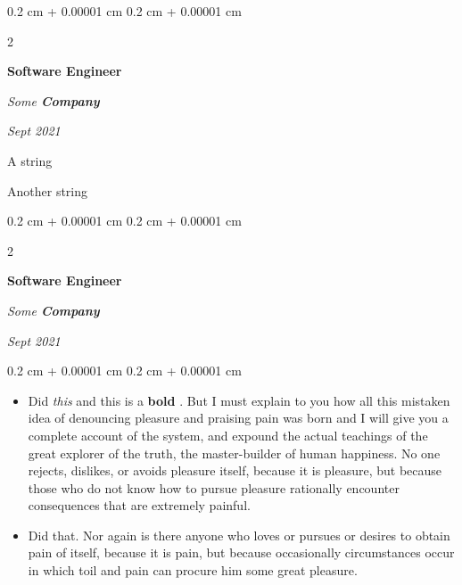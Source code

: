\documentclass[10pt, letterpaper]{article}
\newenvironment{summary}{
    \begin{description}[
        topsep=0.10 cm,
        parsep=0.10 cm,
        partopsep=0pt,
        itemsep=0pt,
        leftmargin=0.4 cm + 10pt
    ]
}{
    \end{description}
} %
\newenvironment{highlights}{
    \begin{itemize}[
        topsep=0.10 cm,
        parsep=0.10 cm,
        partopsep=0pt,
        itemsep=0pt,
        leftmargin=0.4 cm + 10pt
    ]
}{
    \end{itemize}
} %
\newenvironment{onecolentry}{
    \begin{adjustwidth}{
        0.2 cm + 0.00001 cm
    }{
        0.2 cm + 0.00001 cm
    }
}{
    \end{adjustwidth}
} %
\newenvironment{twocolentry}[2][]{
    \onecolentry
    \def\secondColumn{#2}
    \setcolumnwidth{\fill, 4.5 cm}
    \begin{paracol}{2}
}{
    \switchcolumn \raggedleft \secondColumn
    \end{paracol}
    \endonecolentry
} %
\let\hrefWithoutArrow\href
\renewcommand{\href}[2]{\hrefWithoutArrow{#1}{\ifthenelse{\equal{#2}{}}{ }{#2 }\raisebox{.15ex}{\footnotesize \faExternalLink*}}}
\begin{document}
        \vspace{0.2 cm}

        \begin{twocolentry}{
            
            
        \textit{Sept 2021}}
            \textbf{Software Engineer}
            
            \textit{Some \textbf{Company}}
        \end{twocolentry}
            \begin{summary}
                \item A string
                \item Another string
            \end{summary}


        \vspace{0.2 cm}

        \begin{twocolentry}{
            
            
        \textit{Sept 2021}}
            \textbf{Software Engineer}
            
            \textit{Some \textbf{Company}}
        \end{twocolentry}
        \vspace{0.10 cm}
        \begin{onecolentry}
            \begin{highlights}
                \item Did \textit{this} and this is a \textbf{bold} \href{https://example.com}{link}. But I must explain to you how all this mistaken idea of denouncing pleasure and praising pain was born and I will give you a complete account of the system, and expound the actual teachings of the great explorer of the truth, the master-builder of human happiness. No one rejects, dislikes, or avoids pleasure itself, because it is pleasure, but because those who do not know how to pursue pleasure rationally encounter consequences that are extremely painful.
                \item Did that. Nor again is there anyone who loves or pursues or desires to obtain pain of itself, because it is pain, but because occasionally circumstances occur in which toil and pain can procure him some great pleasure.
            \end{highlights}
        \end{onecolentry}


        \vspace{0.2 cm}
\end{document}
